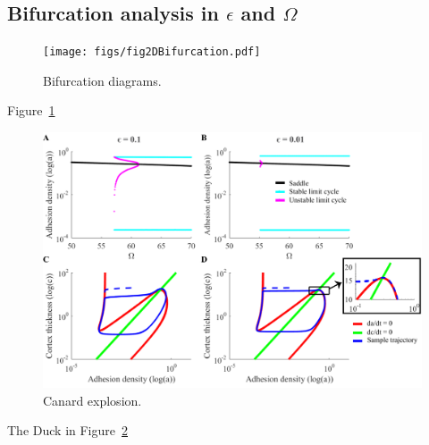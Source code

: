 \subsection{Bifurcation analysis in $\epsilon$ and $\Omega$}

\begin{figure}[htbp]
  \centering
  \label{fig:2DBifurcation}\texttt{[image: figs/fig2DBifurcation.pdf]}
  \caption{Bifurcation diagrams.}
\end{figure}
Figure~\ref{fig:2DBifurcation}

\begin{figure}[htbp]
  \centering
  \label{fig:canard}\includegraphics[width=13cm]{figs/figCanard.pdf}
  \caption{Canard explosion.}
\end{figure}
The Duck in Figure~\ref{fig:canard}
